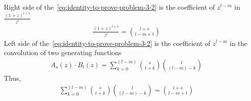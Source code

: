 Right side of the~\eqref{eq:identity-to-prove-problem-3-2} is the coefficient of
$z^{l-m}$ in $\frac{(1+z)^{l+s}}{z^t}$
\begin{align*}
[z^{l-m}]
    \frac{(1+z)^{l+s}}{z^t} = \binom{l+s}{l-m+t}
\end{align*}
Left side of the~\eqref{eq:identity-to-prove-problem-3-2} is the coefficient of $z^{l-m}$
in the convolution of two generating functions
\begin{align*}
[z^{l-m}]
    A_s(z) \cdot B_l(z) = \sum_{k=0}^{(l-m)} \binom{s}{t+k} \binom{l}{(l-m)-k}
\end{align*}
Thus,
\begin{align*}
    \sum_{k=0}^{(l-m)} \binom{s}{t+k} \binom{l}{(l-m)-k} = \binom{l+s}{l-m+t}
\end{align*}

\clearpage
